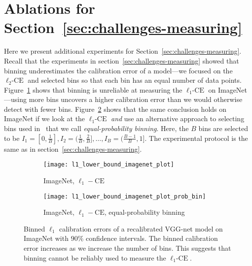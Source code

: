 \newpage
\section{Ablations for Section~\ref{sec:challenges-measuring}}
\label{sec:appendix_platt_experiments}

Here we present additional experiments for Section~\ref{sec:challenges-measuring}.
Recall that the experiments in section~\ref{sec:challenges-measuring} showed that binning underestimates the calibration error of a model---we focused on the $\ell_2\mbox{-CE}$ and selected bins so that each bin has an equal number of data points. Figure~\ref{fig:imagenet_lower_bound_l1} shows that binning is unreliable at measuring the $\ell_1\mbox{-CE}$ on ImageNet---using more bins uncovers a higher calibration error than we would otherwise detect with fewer bins. Figure~\ref{fig:imagenet_lower_bound_l1_prob} shows that the same conclusion holds on ImageNet if we look at the $\ell_1\mbox{-CE}$ \emph{and} use an alternative approach to selecting bins used in~\cite{guo2017calibration} that we call \emph{equal-probability binning}. Here, the $B$ bins are selected to be $I_1 = [0, \frac{1}{B}], I_2 = (\frac{1}{B}, \frac{2}{B}], \dots, I_B = (\frac{B-1}{B}, 1]$. The experimental protocol is the same as in section~\ref{sec:challenges-measuring}.

\begin{figure}
     \centering
     \begin{subfigure}[b]{0.45\textwidth}
         \centering
         \texttt{[image: l1\_lower\_bound\_imagenet\_plot]}
         \caption{ImageNet, $\ell_1-\mbox{CE}$}
         \label{fig:imagenet_lower_bound_l1}
     \end{subfigure}
     \hfill
     \begin{subfigure}[b]{0.45\textwidth}
         \centering
         \texttt{[image: l1\_lower\_bound\_imagenet\_plot\_prob\_bin]}
         \caption{ImageNet, $\ell_1-\mbox{CE}$, equal-probability binning}
         \label{fig:imagenet_lower_bound_l1_prob}
     \end{subfigure}
        \caption{
        Binned $\ell_1$ calibration errors of a recalibrated VGG-net model on ImageNet with $90\%$ confidence intervals. The binned calibration error increases as we increase the number of bins. This suggests that binning cannot be reliably used to measure the $\ell_1\mbox{-CE}$.
        }
        \label{fig:lower_bounds_l1_imagenet}
\end{figure}

